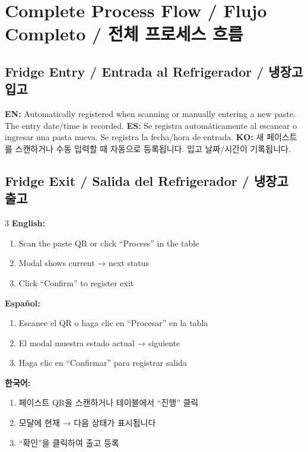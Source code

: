 \documentclass[12pt,a4paper]{article}
\newcommand{\tri}[3]{%
  \textbf{EN:} #1 \quad\textbar\quad \textbf{ES:} #2 \quad\textbar\quad \textbf{KO:} #3%
}
\begin{document}
\section{Complete Process Flow / Flujo Completo / 전체 프로세스 흐름}

\subsection{Fridge Entry / Entrada al Refrigerador / 냉장고 입고}

\tri{Automatically registered when scanning or manually entering a new paste. The entry date/time is recorded.}
{Se registra automáticamente al escanear o ingresar una pasta nueva. Se registra la fecha/hora de entrada.}
{새 페이스트를 스캔하거나 수동 입력할 때 자동으로 등록됩니다. 입고 날짜/시간이 기록됩니다.}

\subsection{Fridge Exit / Salida del Refrigerador / 냉장고 출고}

\begin{multicols}{3}
\textbf{English:}
\begin{enumerate}[leftmargin=*]
\item Scan the paste QR or click ``Process'' in the table
\item Modal shows current → next status
\item Click ``Confirm'' to register exit
\end{enumerate}

\columnbreak
\textbf{Español:}
\begin{enumerate}[leftmargin=*]
\item Escanee el QR o haga clic en ``Procesar'' en la tabla
\item El modal muestra estado actual → siguiente
\item Haga clic en ``Confirmar'' para registrar salida
\end{enumerate}

\columnbreak
\textbf{한국어:}
\begin{enumerate}[leftmargin=*]
\item 페이스트 QR을 스캔하거나 테이블에서 ``진행'' 클릭
\item 모달에 현재 → 다음 상태가 표시됩니다
\item ``확인''을 클릭하여 출고 등록
\end{enumerate}
\end{multicols}
\end{document}
